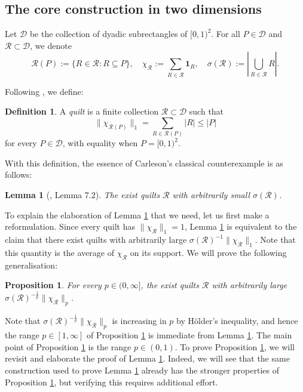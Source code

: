 \documentclass[11pt, reqno]{amsart}
\newtheorem{proposition}[theorem]{Proposition}
\newtheorem{lemma}[theorem]{Lemma}
\theoremstyle{definition}
\newtheorem{definition}[theorem]{Definition}
\theoremstyle{remark}
\numberwithin{equation}{section}
\newcommand{\one}{\mathbf{1}}
\newcommand{\abs}[1]{|#1|}
\newcommand{\Norm}[2]{\|#1\|_{#2}}
\begin{document}
\subsection{The core construction in two dimensions}

Let $\mathscr D$ be the collection of dyadic subrectangles of $[0,1)^2$. For all $P\in\mathscr D$ and $\mathscr R\subset\mathscr D$, we denote
\begin{equation*}
  \mathscr R(P):=\{R\in\mathscr R:R\subseteq P\},\quad
  \chi_{\mathscr R}:=\sum_{R\in\mathscr R}\one_R,\quad
  \sigma(\mathscr R):=\abs{\bigcup_{R\in\mathscr R}R}.
\end{equation*}


Following \cite{Tao}, we define:

\begin{definition}
A {\em quilt} is a finite collection $\mathscr R\subset\mathscr D$ such that
\begin{equation}\label{eq:rectCarleson}
  \Norm{\chi_{\mathscr R(P)}}{1}
  =\sum_{R\in\mathscr R(P)}\abs{R}\leq\abs{P}
\end{equation}
for every $P\in\mathscr D$, with equality when $P=[0,1)^2$.
\end{definition}

With this definition, the essence of Carleson's classical counterexample is as follows:

\begin{lemma}[\cite{Tao}, Lemma 7.2]\label{lem:Tao7.2}
The exist quilts $\mathscr R$ with arbitrarily small $\sigma(\mathscr R)$.
\end{lemma}

To explain the elaboration of Lemma \ref{lem:Tao7.2} that we need, let us first make a reformulation. Since every quilt has $\Norm{\chi_{\mathscr R}}{1}=1$, Lemma \ref{lem:Tao7.2} is equivalent to the claim that there exist quilts with arbitrarily large $\sigma(\mathscr R)^{-1}\Norm{\chi_{\mathscr R}}{1}$. Note that this quantity is the average of $\chi_{\mathscr R}$ on its support. We will prove the following generalisation:

\begin{proposition}\label{prop:CarlNew}
For every $p\in(0,\infty]$, the exist quilts $\mathscr R$ with arbitrarily large $\sigma(\mathscr R)^{-\frac 1p}\Norm{\chi_{\mathscr R}}{p}$.
\end{proposition}

Note that $\sigma(\mathscr R)^{-\frac 1p}\Norm{\chi_{\mathscr R}}{p}$ is increasing in $p$ by H\"older's inequality, and hence the range $p\in[1,\infty]$ of Proposition \ref{prop:CarlNew} is immediate from Lemma \ref{lem:Tao7.2}. The main point of Proposition \ref{prop:CarlNew} is the range $p\in(0,1)$. To prove Proposition \ref{prop:CarlNew}, we will revisit and elaborate the proof of Lemma \ref{lem:Tao7.2}. Indeed, we will see that the same construction used to prove Lemma \ref{lem:Tao7.2} already has the stronger properties of Proposition \ref{prop:CarlNew}, but verifying this requires additional effort.
\end{document}
